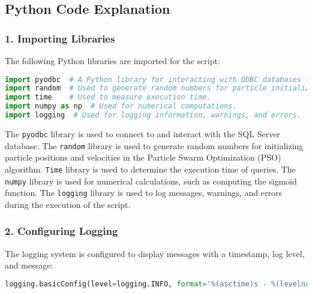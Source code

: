 


\lstset{style=mystyle}



\subsection*{Python Code Explanation}

\subsubsection*{1. Importing Libraries}
The following Python libraries are imported for the script:
\begin{lstlisting}[language=Python]
import pyodbc  # A Python library for interacting with ODBC databases like MSSQL.
import random  # Used to generate random numbers for particle initialization.
import time    # Used to measure execution time.
import numpy as np  # Used for numerical computations.
import logging  # Used for logging information, warnings, and errors.
\end{lstlisting}\vspace{.4cm}
The \texttt{pyodbc} library is used to connect to and interact with the SQL Server database. The \texttt{random} library is used to generate random numbers for initializing particle positions and velocities in the Particle Swarm Optimization (PSO) algorithm. \texttt{Time} library is used to determine the execution time of queries. The \texttt{numpy} library is used for numerical calculations, such as computing the sigmoid function. The \texttt{logging} library is used to log messages, warnings, and errors during the execution of the script.

\subsubsection*{2. Configuring Logging}
The logging system is configured to display messages with a timestamp, log level, and message:
\begin{lstlisting}[language=Python]
logging.basicConfig(level=logging.INFO, format='%(asctime)s - %(levelname)s - %(message)s')
\end{lstlisting}\vspace{.4cm}

